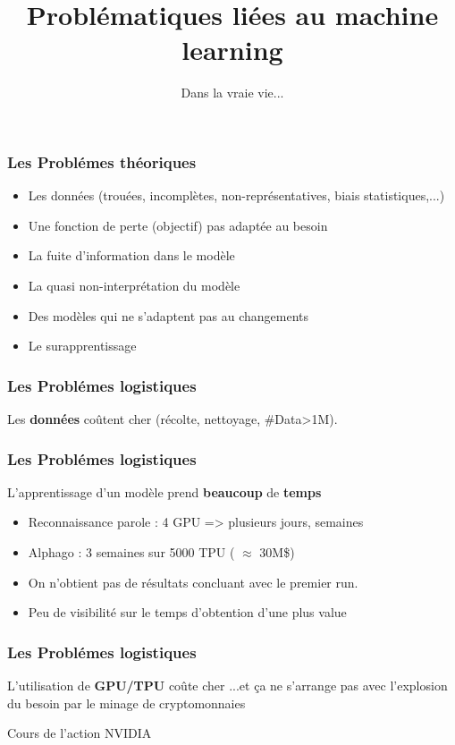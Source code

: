 \documentclass{formation}
\title{Problématiques liées au machine learning}
\subtitle{Dans la vraie vie...}
\begin{document}
\maketitle

\begin{frame}
  \frametitle{Les Problémes théoriques}
  \begin{itemize}
  \item Les données (trouées, incomplètes, non-représentatives, biais statistiques,...)
  \item Une fonction de perte (objectif) pas adaptée au besoin
  \item La fuite d'information dans le modèle
  \item La quasi non-interprétation du modèle
  \item Des modèles qui ne s'adaptent pas au changements
  \item Le surapprentissage
  \end{itemize}
\end{frame}

\begin{frame}
  \frametitle{Les Problémes logistiques}
  Les \textbf{données} coûtent cher (récolte, nettoyage, \#Data>1M). 
\end{frame}

\begin{frame}
  \frametitle{Les Problémes logistiques}
  L'apprentissage d'un modèle prend \textbf{beaucoup} de \textbf{temps}
  \begin{itemize}
  \item Reconnaissance parole : 4 GPU => plusieurs jours, semaines
  \item Alphago : 3 semaines sur 5000 TPU ( $\approx$ 30M\$)
  \item On n'obtient pas de résultats concluant avec le premier run.
  \item Peu de visibilité sur le temps d'obtention d'une plus value
  \end{itemize}
\end{frame}

\begin{frame}
  \frametitle{Les Problémes logistiques}
  L'utilisation de \textbf{GPU/TPU} coûte cher
  \newline
  ...et ça ne s'arrange pas avec l'explosion du besoin par le minage de cryptomonnaies
  \begin{center}
    \small Cours de l'action NVIDIA
  \end{center}
\end{frame}
\end{document}

